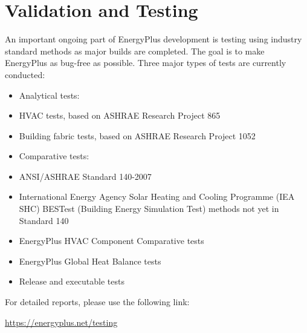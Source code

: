 \chapter{Validation and Testing}\label{validation-and-testing}

An important ongoing part of EnergyPlus development is testing using industry standard methods as major builds are completed.
The goal is to make EnergyPlus as bug-free as possible. Three major types of tests are currently conducted:

\begin{itemize}
\item
  Analytical tests:
\item
  HVAC tests, based on ASHRAE Research Project 865
\item
  Building fabric tests, based on ASHRAE Research Project 1052
\item
  Comparative tests:
\item
  ANSI/ASHRAE Standard 140-2007
\item
  International Energy Agency Solar Heating and Cooling Programme (IEA SHC) BESTest (Building Energy Simulation Test) methods not yet in Standard 140
\item
  EnergyPlus HVAC Component Comparative tests
\item
  EnergyPlus Global Heat Balance tests
\item
  Release and executable tests
\end{itemize}

For detailed reports, please use the following link:

\url{https://energyplus.net/testing}
